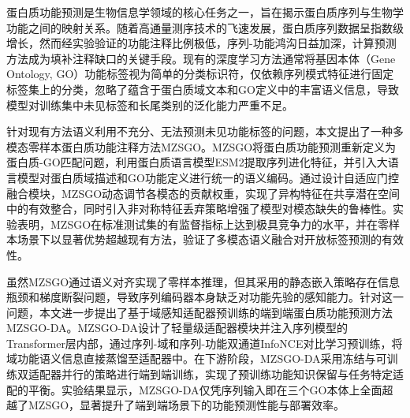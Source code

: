 \begin{cabstract}

蛋白质功能预测是生物信息学领域的核心任务之一，旨在揭示蛋白质序列与生物学功能之间的映射关系。随着高通量测序技术的飞速发展，蛋白质序列数据呈指数级增长，然而经实验验证的功能注释比例极低，序列-功能鸿沟日益加深，计算预测方法成为填补注释缺口的关键手段。现有的深度学习方法通常将基因本体（Gene Ontology, GO）功能标签视为简单的分类标识符，仅依赖序列模式特征进行固定标签集上的分类，忽略了蕴含于蛋白质域文本和GO定义中的丰富语义信息，导致模型对训练集中未见标签和长尾类别的泛化能力严重不足。

针对现有方法语义利用不充分、无法预测未见功能标签的问题，本文提出了一种多模态零样本蛋白质功能注释方法MZSGO。MZSGO将蛋白质功能预测重新定义为蛋白质-GO匹配问题，利用蛋白质语言模型ESM2提取序列进化特征，并引入大语言模型对蛋白质域描述和GO功能定义进行统一的语义编码。通过设计自适应门控融合模块，MZSGO动态调节各模态的贡献权重，实现了异构特征在共享潜在空间中的有效整合，同时引入非对称特征丢弃策略增强了模型对模态缺失的鲁棒性。实验表明，MZSGO在标准测试集的有监督指标上达到极具竞争力的水平，并在零样本场景下以显著优势超越现有方法，验证了多模态语义融合对开放标签预测的有效性。

虽然MZSGO通过语义对齐实现了零样本推理，但其采用的静态嵌入策略存在信息瓶颈和梯度断裂问题，导致序列编码器本身缺乏对功能先验的感知能力。针对这一问题，本文进一步提出了基于域感知适配器预训练的端到端蛋白质功能预测方法MZSGO-DA。MZSGO-DA设计了轻量级适配器模块并注入序列模型的Transformer层内部，通过序列-域和序列-功能双通道InfoNCE对比学习预训练，将域功能语义信息直接蒸馏至适配器中。在下游阶段，MZSGO-DA采用冻结与可训练双适配器并行的策略进行端到端训练，实现了预训练功能知识保留与任务特定适配的平衡。实验结果显示，MZSGO-DA仅凭序列输入即在三个GO本体上全面超越了MZSGO，显著提升了端到端场景下的功能预测性能与部署效率。

\end{cabstract}

